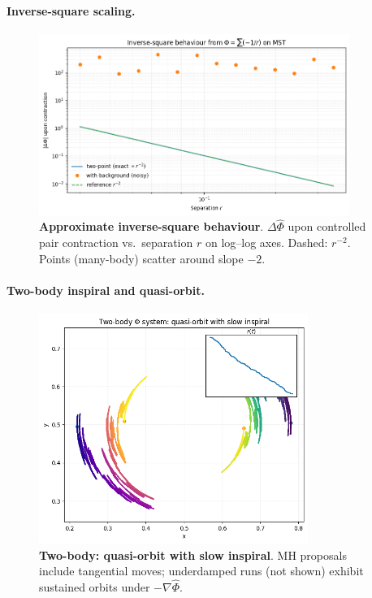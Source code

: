 \documentclass[aps,preprint,onecolumn,longbibliography,nofootinbib]{revtex4-2}
\numberwithin{equation}{section}        %
\begin{document}
\paragraph*{Inverse-square scaling.}
\begin{figure}[H]
\centering
\includegraphics[width=0.9\textwidth]{figures/inverse_square.png}
\caption{\textbf{Approximate inverse-square behaviour}. $\Delta \widehat\Phi$ upon controlled pair contraction vs.\ separation $r$ on log--log axes. Dashed: $r^{-2}$. Points (many-body) scatter around slope $-2$.}
\label{fig:inverse}
\end{figure}

\paragraph*{Two-body inspiral and quasi-orbit.}
\begin{figure}[H]
\centering
\includegraphics[width=0.78\textwidth]{figures/orbit_two_body.png}
\caption{\textbf{Two-body: quasi-orbit with slow inspiral}. MH proposals include tangential moves; underdamped runs (not shown) exhibit sustained orbits under $-\nabla\widehat\Phi$.}
\label{fig:twoorbit}
\end{figure}
\end{document}
